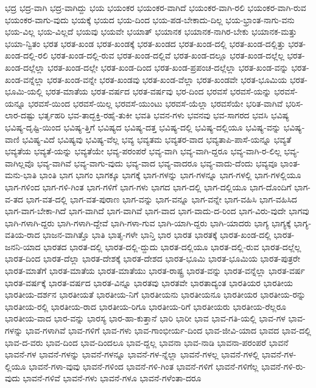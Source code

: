 {ಭದ್ರ
ಭದ್ರ-ವಾಗಿ
ಭದ್ರ-ವಾಗಿದ್ದು
ಭಯ
ಭಯಂಕರ
ಭಯಂಕರ-ವಾಗಿದೆ
ಭಯಂಕರ-ವಾಗಿ-ರಲಿ
ಭಯಂಕರ-ವಾಗಿ-ರುವ
ಭಯಂಕರ-ವಾಗು-ವುದು
ಭಯಕ್ಕೆ
ಭಯದ
ಭಯ-ದಿಂದ
ಭಯ-ಪಡ-ಬೇಕಾದು-ದಿಲ್ಲ
ಭಯ-ಭ್ರಾಂತ-ನಾಗು-ವನು
ಭಯ-ವಿಲ್ಲ
ಭಯ-ವಿಲ್ಲದೆ
ಭಯವು
ಭಯವೇ
ಭಯಾತ್
ಭಯಾನಕ
ಭಯಾನಕ-ನಾಗಿರ-ಬೇಕು
ಭಯಾನಕ-ಮತ್ತು
ಭಯಾ-ನ್ವಿತಂ
ಭರತ
ಭರತ-ಖಂಡ
ಭರತ-ಖಂಡಕ್ಕೆ
ಭರತ-ಖಂಡದ
ಭರತ-ಖಂಡ-ದಲ್ಲಿ
ಭರತ-ಖಂಡ-ದಲ್ಲಿತ್ತು
ಭರತ-ಖಂಡ-ದಲ್ಲಿ-ರಲಿ
ಭರತ-ಖಂಡ-ದಲ್ಲಿ-ರುವ
ಭರತ-ಖಂಡ-ದಲ್ಲಿವೆ
ಭರತ-ಖಂಡ-ದಲ್ಲೂ
ಭರತ-ಖಂಡ-ದಲ್ಲೆಲ್ಲ
ಭರತ-ಖಂಡ-ದಲ್ಲೆಲ್ಲಾ
ಭರತ-ಖಂಡ-ದಲ್ಲೇ
ಭರತ-ಖಂಡ-ದಿಂದ
ಭರತ-ಖಂಡ-ಪ್ರಪಂಚ-ದಲ್ಲೆಲ್ಲಾ
ಭರತ-ಖಂಡ-ವನ್ನು
ಭರತ-ಖಂಡ-ವನ್ನೆಲ್ಲಾ
ಭರತ-ಖಂಡ-ವನ್ನೇ
ಭರತ-ಖಂಡವು
ಭರತ-ಖಂಡ-ವೆಲ್ಲಾ
ಭರತ-ಖಂಡವೇ
ಭರತ-ಭೂಮಿಯ
ಭರತ-ಭೂಮಿ-ಯಲ್ಲಿ
ಭರತ-ಮಾತೆಯ
ಭರತ-ವರ್ಷದ
ಭರತ-ವರ್ಷವು
ಭರ-ದಿಂದ
ಭರವಸೆ
ಭರವಸೆ-ಯನ್ನು
ಭರವಸೆ-ಯನ್ನೂ
ಭರವಸೆ-ಯಿಂದ
ಭರವಸೆ-ಯಿಲ್ಲ
ಭರವಸೆ-ಯುಂಟು
ಭರವಸೆ-ಯೆಲ್ಲಾ
ಭರವಸೆಯೇ
ಭರಿತ-ವಾಗಿವೆ
ಭರಿಸ-ಲಾರ-ದಷ್ಟು
ಭರ್ತೃಹರಿ
ಭವ-ತಾದ್ಭಕ್ತಿ-ರಹೈ-ತುಕೀ
ಭವತಿ
ಭವನ-ಗಳು
ಭವನವು
ಭವ-ಸಾಗರದ
ಭವಸಿ
ಭವಿಷ್ಯ
ಭವಿಷ್ಯ-ದೃಷ್ಟಿ-ಯಿಂದ
ಭವಿಷ್ಯ-ತ್ತಿಗೆ
ಭವಿಷ್ಯದ
ಭವಿಷ್ಯ-ದತ್ತ
ಭವಿಷ್ಯ-ದಲ್ಲಿ
ಭವಿಷ್ಯ-ದಲ್ಲಿಯೂ
ಭವಿಷ್ಯ-ವನ್ನು
ಭವಿಷ್ಯ-ವಾಣಿ
ಭವಿಷ್ಯ-ವಿದೆ
ಭವಿಷ್ಯವು
ಭವಿಷ್ಯ-ವೆಲ್ಲ
ಭವ್ಯ
ಭವ್ಯತಮ
ಭವ್ಯತರ-ವಾದ
ಭವ್ಯತಾಪಿ-ಪಾಸೆ-ಯನ್ನೂ
ಭವ್ಯತೆ
ಭವ್ಯತೆಯ
ಭವ್ಯತೆ-ಯನ್ನು
ಭವ್ಯತೆಯೇ
ಭವ್ಯ-ಪರಂಪರೆ
ಭವ್ಯ-ವಾಗಿ
ಭವ್ಯ-ವಾಗಿ-ದ್ದರೂ
ಭವ್ಯ-ವಾಗಿ-ರ-ಲಿಲ್ಲ
ಭವ್ಯ-ವಾಗಿಲ್ಲವೊ
ಭವ್ಯ-ವಾಗಿವೆ
ಭವ್ಯ-ವಾಗು-ವುದು
ಭವ್ಯ-ವಾದ
ಭವ್ಯ-ವಾದರೂ
ಭವ್ಯ-ವಾದು-ದೆಂದು
ಭವ್ಯವೂ
ಭಾಂತ-ಮನು-ಭಾತಿ
ಭಾಂತಿ
ಭಾಗ
ಭಾಗಂ
ಭಾಗಕ್ಕೂ
ಭಾಗಕ್ಕೆ
ಭಾಗ-ಗಳನ್ನು
ಭಾಗ-ಗಳನ್ನೂ
ಭಾಗ-ಗಳಲ್ಲಿ
ಭಾಗ-ಗಳಲ್ಲಿಯೂ
ಭಾಗ-ಗಳಿಂದ
ಭಾಗ-ಗಳಿ-ಗಿಂತ
ಭಾಗ-ಗಳಿಗೆ
ಭಾಗ-ಗಳು
ಭಾಗದ
ಭಾಗ-ದಲ್ಲಿ
ಭಾಗ-ದಲ್ಲಿಯೂ
ಭಾಗ-ದೊಂದಿಗೆ
ಭಾಗ-ವ-ತದ
ಭಾಗ-ವತ-ದಲ್ಲಿ
ಭಾಗ-ವತ-ಪುರಾಣ
ಭಾಗ-ವನ್ನು
ಭಾಗ-ವನ್ನೂ
ಭಾಗ-ವನ್ನೇ
ಭಾಗ-ವಹಿಸಿ
ಭಾಗ-ವಹಿಸಿದ
ಭಾಗ-ವಾಗ-ಬೇಕಾ-ಗಿದೆ
ಭಾಗ-ವಾಗಿದೆ
ಭಾಗ-ವಾಗಿವೆ
ಭಾಗ-ವಾದ
ಭಾಗ-ವಾದು-ದ-ರಿಂದ
ಭಾಗ-ವಿರು-ವುದೇ
ಭಾಗವು
ಭಾಗಿ-ಗಳಾಗಿ-ದ್ದರು
ಭಾಗಿ-ಗಳಾಗಿ-ದ್ದೇವೆ
ಭಾಗಿ-ಗಳಾ-ಗುವ
ಭಾಗಿ-ಯಾಗಿ-ದ್ದರು
ಭಾಗಿ-ಯಾದರು
ಭಾಗ್ಯ
ಭಾಗ್ಯಕ್ಕೆ
ಭಾಗ್ಯ-ವತಿಯ-ರಾದ
ಭಾಜನ-ವಾಗಿತ್ತೊ
ಭಾತಿ
ಭಾತೃ-ಗಳೇ
ಭಾನ್ತಿ
ಭಾರ
ಭಾರತ
ಭಾರತಕ್ಕೆ
ಭಾರತ-ಖಂಡ-ದಲ್ಲಿ
ಭಾರತ-ಜನನಿ-ಯಾದ
ಭಾರತದ
ಭಾರತ-ದಲ್ಲಿ
ಭಾರತ-ದಲ್ಲಿ-ದ್ದುದು
ಭಾರತ-ದಲ್ಲಿಯೂ
ಭಾರತ-ದಲ್ಲಿ-ರುವ
ಭಾರತ-ದಲ್ಲೆಲ್ಲ
ಭಾರತ-ದಿಂದ
ಭಾರತ-ದೆಲ್ಲಾ
ಭಾರತ-ದೇಶಕ್ಕೆ
ಭಾರತ-ದೇಶದ
ಭಾರತ-ಭೂಮಿ
ಭಾರತ-ಭೂಮಿಯ
ಭಾರತ-ಪುತ್ರರೇ
ಭಾರತ-ಮಾತೆಗೆ
ಭಾರತ-ಮಾತೆಯ
ಭಾರತ-ಮಾತೆಯು
ಭಾರತ-ರಾಷ್ಟ್ರ
ಭಾರತ-ವನ್ನು
ಭಾರತ-ವನ್ನೆಲ್ಲಾ
ಭಾರತ-ವರ್ಷ
ಭಾರತ-ವರ್ಷಕ್ಕೆ
ಭಾರತ-ವರ್ಷದ
ಭಾರತ-ವಿನ್ನೂ
ಭಾರತವು
ಭಾರತವೇ
ಭಾರತಾದ್ಯಂತ
ಭಾರತಿಯರ
ಭಾರತೀಯ
ಭಾರತೀಯ-ದರ್ಶನ
ಭಾರತೀಯತೆ
ಭಾರತೀಯ-ನಿಗೆ
ಭಾರತೀಯನು
ಭಾರತೀಯನೂ
ಭಾರತೀಯರ
ಭಾರತೀಯ-ರನ್ನು
ಭಾರತೀಯ-ರಲ್ಲಿ
ಭಾರತೀಯ-ರಾದ
ಭಾರತೀಯ-ರಿಗೂ
ಭಾರತೀಯ-ರಿಗೆ
ಭಾರತೀಯರು
ಭಾರತೀಯ-ರೆಲ್ಲರೂ
ಭಾರತೀಯ-ವಾದ
ಭಾರ-ವನ್ನು
ಭಾರಸ್ಯ
ಭಾರ-ಹಾ-ಕುತ್ತಾನೆ
ಭಾರಿ
ಭಾರೀ
ಭಾವ
ಭಾವ-ಗತಿ-ಯಲ್ಲಿ
ಭಾವ-ಗಳ
ಭಾವ-ಗಳನ್ನು
ಭಾವ-ಗಳಾಗಿವೆ
ಭಾವ-ಗಳಿಗೆ
ಭಾವ-ಗಳು
ಭಾವ-ಗಾಂಭೀರ್ಯ-ದಿಂದ
ಭಾವ-ಜೀವಿ-ಯಾದ
ಭಾವದ
ಭಾವ-ದಲ್ಲಿ
ಭಾವ-ದ-ವರು
ಭಾವ-ದಿಂದ
ಭಾವ-ದಿಂದಲೂ
ಭಾವ-ದ್ದಲ್ಲ
ಭಾವನಾ
ಭಾವ-ನಾಡಿ
ಭಾವನಾ-ಪರಂಪರೆ
ಭಾವನೆ
ಭಾವನೆ-ಗಳ
ಭಾವನೆ-ಗಳನ್ನು
ಭಾವನೆ-ಗಳನ್ನೂ
ಭಾವನೆ-ಗಳ-ನ್ನೆಲ್ಲಾ
ಭಾವನೆ-ಗಳಲ್ಲ
ಭಾವನೆ-ಗಳಲ್ಲಿ
ಭಾವನೆ-ಗಳ-ಲ್ಲಿಯೂ
ಭಾವನೆ-ಗಳಾ-ವುವು
ಭಾವನೆ-ಗಳಿಂದ
ಭಾವನೆ-ಗಳಿ-ಗಿಂತ
ಭಾವನೆ-ಗಳಿಗೆ
ಭಾವನೆ-ಗಳಿಗೆಲ್ಲ
ಭಾವನೆ-ಗಳಿ-ರು-ವುದು
ಭಾವನೆ-ಗಳಿವೆ
ಭಾವನೆ-ಗಳು
ಭಾವನೆ-ಗಳೂ
ಭಾವನೆ-ಗಳೆಂತಾ-ದರೂ
}
